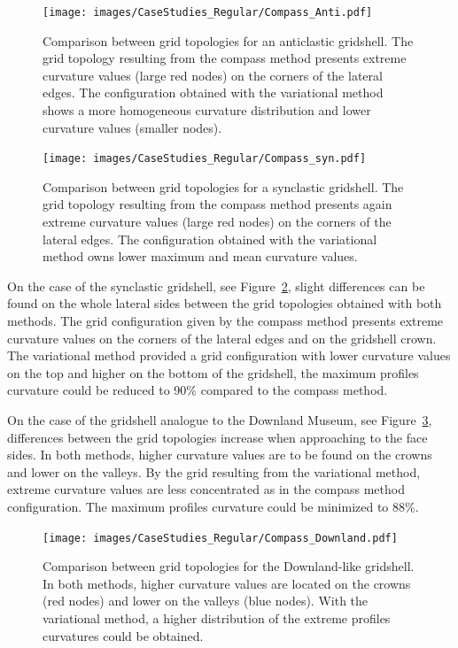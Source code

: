 \documentclass[Thesis.tex]{subfiles}
\begin{document}
\begin{figure}
\centering
\texttt{[image: images/CaseStudies\_Regular/Compass\_Anti.pdf]}
\caption{Comparison between grid topologies for an anticlastic gridshell. The grid topology resulting from the compass method presents extreme curvature values (large red nodes) on the corners of the lateral edges. The configuration obtained with the variational method shows a more homogeneous curvature distribution and lower curvature values (smaller nodes).}
\label{fig:Compass_Anti}
\end{figure}

\begin{figure}
\centering
\texttt{[image: images/CaseStudies\_Regular/Compass\_syn.pdf]}
\caption{Comparison between grid topologies for a synclastic gridshell. The grid topology resulting from the compass method presents again extreme curvature values (large red nodes) on the corners of the lateral edges. The configuration obtained with the variational method owns lower maximum and mean curvature values.}
\label{fig:Compass_Syn}
\end{figure}

On the case of the synclastic gridshell, see Figure~\ref{fig:Compass_Syn}, slight differences can be found on the whole lateral sides between the grid topologies obtained with both methods. The grid configuration given by the compass method presents extreme curvature values on the corners of the lateral edges and on the gridshell crown. The variational method provided a grid configuration with lower curvature values on the top and higher on the bottom of the gridshell, the  maximum profiles curvature could be reduced to 90\% compared to the compass method.

On the case of the gridshell analogue to the Downland Museum, see Figure~\ref{fig:Compass_Downland}, differences between the grid topologies increase when approaching to the face sides. In both methods, higher curvature values are to be found on the crowns and lower on the valleys. By the grid resulting from the variational method, extreme curvature values are less concentrated as in the compass method configuration. The maximum profiles curvature could be minimized to 88\%.

\begin{figure}
\centering
\texttt{[image: images/CaseStudies\_Regular/Compass\_Downland.pdf]}
\caption{Comparison between grid topologies for the Downland-like gridshell. In both methods, higher curvature values are located on the crowns (red nodes) and lower on the valleys (blue nodes). With the variational method, a higher distribution of the extreme profiles curvatures could be obtained.}
\label{fig:Compass_Downland}
\end{figure}
\end{document}
